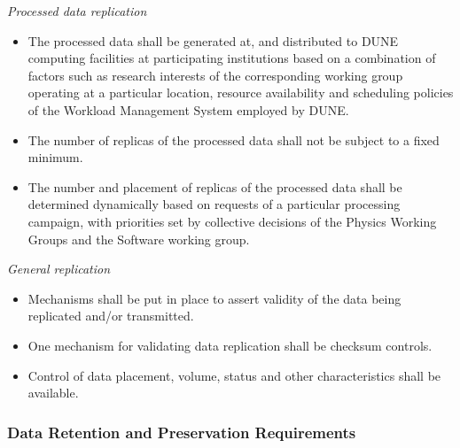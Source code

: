 \textit{Processed data replication}

\begin{itemize}

\item The processed data shall be generated at, and distributed to DUNE computing facilities at participating institutions 
based on a combination of factors such as research interests of the corresponding working group operating at a particular location, 
resource availability and scheduling policies of the Workload Management System employed by DUNE.

\item The number of replicas of the processed data shall not be subject to a fixed minimum. 

\item The number and placement of replicas of the processed data shall be determined dynamically based on requests of a particular processing campaign, with priorities set by collective decisions of the Physics Working Groups and the Software working group.
\end{itemize}

\textit{General replication}

\begin{itemize}
\item Mechanisms shall be put in place to assert validity of the data being replicated and/or transmitted.

\item One mechanism for validating data replication shall be checksum controls.

\item Control of data placement, volume, status and other characteristics shall be available.
\end{itemize}

\subsubsection{Data Retention and Preservation Requirements}

